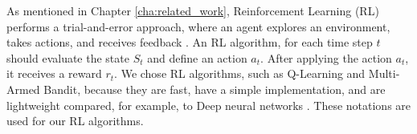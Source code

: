 As mentioned in Chapter \ref{cha:related_work}, Reinforcement Learning (RL) performs a trial-and-error approach, where an agent explores an environment, takes actions, and receives feedback \cite{kaelbling1996reinforcement}. An RL algorithm, for each time step $t$ should evaluate the state $S_t$ and define an action $a_t$. After applying the action $a_t$, it receives a reward $r_t$. We chose RL algorithms, such as Q-Learning and Multi-Armed Bandit, because they are fast, have a simple implementation, and are lightweight compared, for example, to Deep neural networks \cite{yang2017method}. These notations are used for our RL algorithms.
